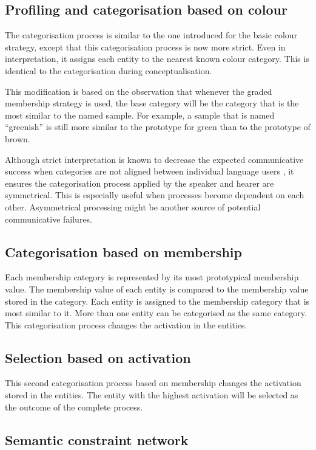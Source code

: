\subsection{Profiling and categorisation based on colour}

The categorisation process is similar to the one introduced for the
basic colour strategy, except that this categorisation process
is now more strict. Even in interpretation, it assigns each entity to
the nearest known colour category. This is identical to the
categorisation during conceptualisation.

This modification is based on the observation that whenever the
graded membership strategy is used, the base category will be
the category that is the most similar to the named sample. For
example, a sample that is named ``greenish'' is still more similar to
the prototype for green than to the prototype of brown.

Although strict interpretation is known to decrease the expected
communicative success when categories are not aligned between
individual language users \citep{belpaeme07language}, it ensures the
categorisation process applied by the speaker and hearer are
symmetrical. This is especially useful when processes become dependent
on each other. Asymmetrical processing might be another source of
potential communicative failures.

\subsection{Categorisation based on membership}

Each membership category is represented by its most prototypical
membership value. The membership value of each entity is compared to
the membership value stored in the category. Each entity is assigned
to the membership category that is most similar to it. More than one
entity can be categorised as the same category. This categorisation
process changes the activation in the entities.

\subsection{Selection based on activation}

This second categorisation process based on membership changes the
activation stored in the entities. The entity with the highest
activation will be selected as the outcome of the complete process.

\subsection{Semantic constraint network}

